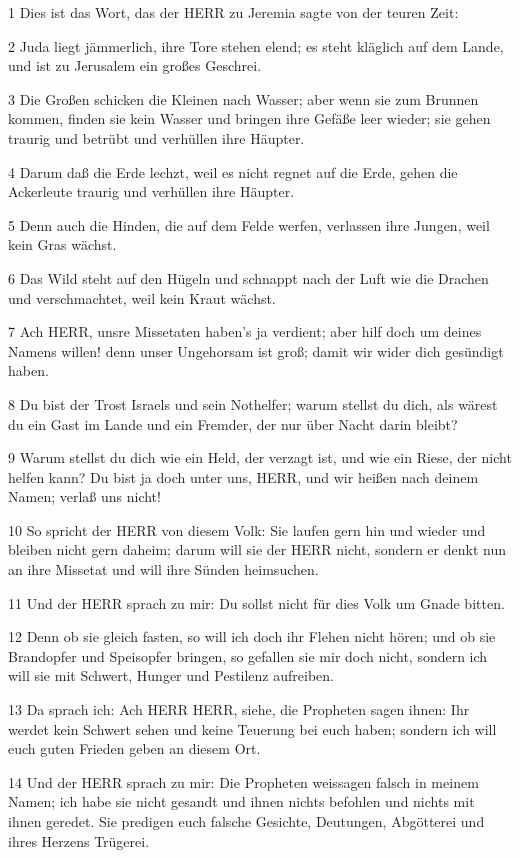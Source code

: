 \par 1 Dies ist das Wort, das der HERR zu Jeremia sagte von der teuren Zeit:
\par 2 Juda liegt jämmerlich, ihre Tore stehen elend; es steht kläglich auf dem Lande, und ist zu Jerusalem ein großes Geschrei.
\par 3 Die Großen schicken die Kleinen nach Wasser; aber wenn sie zum Brunnen kommen, finden sie kein Wasser und bringen ihre Gefäße leer wieder; sie gehen traurig und betrübt und verhüllen ihre Häupter.
\par 4 Darum daß die Erde lechzt, weil es nicht regnet auf die Erde, gehen die Ackerleute traurig und verhüllen ihre Häupter.
\par 5 Denn auch die Hinden, die auf dem Felde werfen, verlassen ihre Jungen, weil kein Gras wächst.
\par 6 Das Wild steht auf den Hügeln und schnappt nach der Luft wie die Drachen und verschmachtet, weil kein Kraut wächst.
\par 7 Ach HERR, unsre Missetaten haben's ja verdient; aber hilf doch um deines Namens willen! denn unser Ungehorsam ist groß; damit wir wider dich gesündigt haben.
\par 8 Du bist der Trost Israels und sein Nothelfer; warum stellst du dich, als wärest du ein Gast im Lande und ein Fremder, der nur über Nacht darin bleibt?
\par 9 Warum stellst du dich wie ein Held, der verzagt ist, und wie ein Riese, der nicht helfen kann? Du bist ja doch unter uns, HERR, und wir heißen nach deinem Namen; verlaß uns nicht!
\par 10 So spricht der HERR von diesem Volk: Sie laufen gern hin und wieder und bleiben nicht gern daheim; darum will sie der HERR nicht, sondern er denkt nun an ihre Missetat und will ihre Sünden heimsuchen.
\par 11 Und der HERR sprach zu mir: Du sollst nicht für dies Volk um Gnade bitten.
\par 12 Denn ob sie gleich fasten, so will ich doch ihr Flehen nicht hören; und ob sie Brandopfer und Speisopfer bringen, so gefallen sie mir doch nicht, sondern ich will sie mit Schwert, Hunger und Pestilenz aufreiben.
\par 13 Da sprach ich: Ach HERR HERR, siehe, die Propheten sagen ihnen: Ihr werdet kein Schwert sehen und keine Teuerung bei euch haben; sondern ich will euch guten Frieden geben an diesem Ort.
\par 14 Und der HERR sprach zu mir: Die Propheten weissagen falsch in meinem Namen; ich habe sie nicht gesandt und ihnen nichts befohlen und nichts mit ihnen geredet. Sie predigen euch falsche Gesichte, Deutungen, Abgötterei und ihres Herzens Trügerei.
